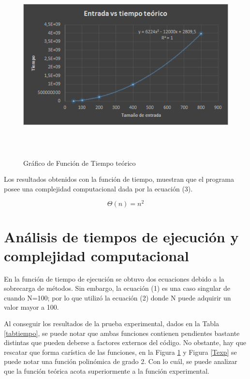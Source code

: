 \documentclass[12pt,letterpaper]{article}
\begin{document}
\begin{figure}[H]
\centering
\includegraphics[height= 10cm, width=\textwidth]{img/grafica2}
\caption{\label{Tteo} Gráfico de Función de Tiempo teórico}
\end{figure}

Los resultados obtenidos con la función de tiempo, muestran que el programa posee una complejidad computacional dada por la ecuación (3).

\begin{equation}
\Theta(n)= n^{2}
\end{equation}

\newpage 
\section{Análisis de tiempos de ejecución y complejidad computacional}
En la función de tiempo de ejecución se obtuvo dos ecuaciones debido a la sobrecarga de métodos. Sin embargo, la ecuación (1) es una caso singular de cuando N=100; por lo que utilizó la ecuación (2) donde N puede adquirir un valor mayor a 100.


Al conseguir los resultados de la prueba experimental, dados en la Tabla \ref{tabtiempo}, se puede notar que ambas funciones contienen pendientes bastante distintas que pueden deberse a factores externos del código. No obstante, hay que rescatar que forma carística de las funciones, en la Figura \ref{Tteo} y Figura \ref{Texp} se puede notar una función polinómica de grado 2. Con lo cuál, se puede analizar que la función teórica acota superiormente a la función experimental.
\end{document}
